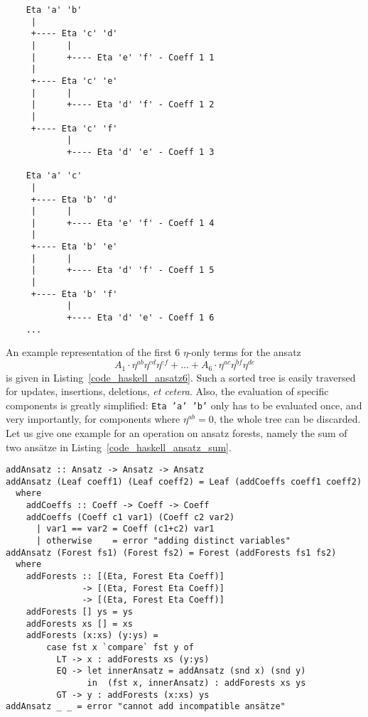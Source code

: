 \begin{code}
  \begin{verbatim}
    Eta 'a' 'b'
     |
     +---- Eta 'c' 'd'
     |      |
     |      +---- Eta 'e' 'f' - Coeff 1 1
     |
     +---- Eta 'c' 'e'
     |      |
     |      +---- Eta 'd' 'f' - Coeff 1 2
     |
     +---- Eta 'c' 'f'
            |
            +---- Eta 'd' 'e' - Coeff 1 3

    Eta 'a' 'c'
     |
     +---- Eta 'b' 'd'
     |      |
     |      +---- Eta 'e' 'f' - Coeff 1 4
     |
     +---- Eta 'b' 'e'
     |      |
     |      +---- Eta 'd' 'f' - Coeff 1 5
     |
     +---- Eta 'b' 'f'
            |
            +---- Eta 'd' 'e' - Coeff 1 6
    ...
  \end{verbatim}
  \label{code_haskell_ansatz6}
\end{code}
An example representation of the first 6 $\eta$-only terms for the ansatz
\begin{equation}
  A_1 \cdot \eta^{ab} \eta^{cd} \eta^{ef} + \dots + A_6 \cdot \eta^{ac} \eta^{bf} \eta^{de}
\end{equation}
is given in Listing~\ref{code_haskell_ansatz6}. Such a sorted tree is easily traversed for updates, insertions, deletions, \emph{et cetera}. Also, the evaluation of specific components is greatly simplified: \texttt{Eta 'a' 'b'} only has to be evaluated once, and very importantly, for components where $\eta^{ab} = 0$, the whole tree can be discarded. Let us give one example for an operation on ansatz forests, namely the sum of two ansätze in Listing~\ref{code_haskell_ansatz_sum}.
\begin{code}
  \begin{verbatim}
addAnsatz :: Ansatz -> Ansatz -> Ansatz
addAnsatz (Leaf coeff1) (Leaf coeff2) = Leaf (addCoeffs coeff1 coeff2)
  where
    addCoeffs :: Coeff -> Coeff -> Coeff
    addCoeffs (Coeff c1 var1) (Coeff c2 var2)
      | var1 == var2 = Coeff (c1+c2) var1
      | otherwise    = error "adding distinct variables"
addAnsatz (Forest fs1) (Forest fs2) = Forest (addForests fs1 fs2)
  where
    addForests :: [(Eta, Forest Eta Coeff)]
               -> [(Eta, Forest Eta Coeff)]
               -> [(Eta, Forest Eta Coeff)]
    addForests [] ys = ys
    addForests xs [] = xs
    addForests (x:xs) (y:ys) =
        case fst x `compare` fst y of
          LT -> x : addForests xs (y:ys)
          EQ -> let innerAnsatz = addAnsatz (snd x) (snd y)
                in  (fst x, innerAnsatz) : addForests xs ys
          GT -> y : addForests (x:xs) ys
addAnsatz _ _ = error "cannot add incompatible ansätze"
  \end{verbatim}
  \label{code_haskell_ansatz_sum}
\end{code}
